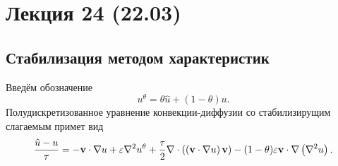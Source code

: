 \section{Лекция 24 (22.03)}

\subsection{Стабилизация методом характеристик}
\label{seq:char-stab}

Введём обозначение
$$
u^\theta = \theta \hat u + \left(1 - \theta\right) u.
$$
Полудискретизованное уравнение конвекции-диффузии со стабилизирущим слагаемым
примет вид
\begin{equation}
\label{eq:cg_stab_multidim}
\frac{\hat u - u}{\tau} =
-\boldsymbol{\rm v} \cdot \nabla u 
+\varepsilon \nabla^2 u^\theta
+\frac{\tau}{2} \nabla\cdot \left(\left(\boldsymbol{\rm v} \cdot \nabla u\right)\boldsymbol{\rm v}\right)
- (1-\theta)\varepsilon\boldsymbol{\rm v} \cdot \nabla\left(\nabla^2 u\right).
\end{equation}

